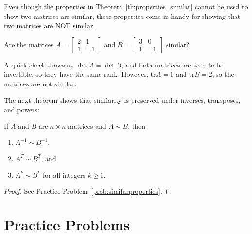 \documentclass{ximera}
\begin{document}
Even though the properties in Theorem~\ref{th:properties_similar} cannot be used to show two matrices are similar, these properties come in handy for showing that two matrices are NOT similar.
 
\begin{example}\label{ex:areTheySimilar}
Are the matrices $A =
\begin{bmatrix}
2 & 1 \\
1 & -1
\end{bmatrix}$ and $B =
\begin{bmatrix}
3 & 0 \\
1 & -1
\end{bmatrix}$ similar?
\begin{explanation}
A quick check shows us $\det A = \det B$, and both matrices are seen to be invertible, so they have the same rank.  However, $\mbox{tr} A = 1$ and $\mbox{tr} B = 2$, so the matrices are not similar.
\end{explanation}
\end{example}
 
The next theorem shows that similarity is preserved under inverses, transposes, and powers:
 
\begin{theorem}\label{th:other_properties_similar}
If $A$ and $B$ are $n\times n$ matrices and $A\sim B$, then
\begin{enumerate}
\item\label{th:properties_similar_inverse} $A^{-1} \sim B^{-1}$,
\item\label{th:properties_similar_transpose} $A^T \sim B^T$, and
\item\label{th:properties_similar_powers} $A^k \sim B^k$ for all integers $k \geq 1$.
\end{enumerate}
\end{theorem}
 
\begin{proof}
See Practice Problem~\ref{prob:similarproperties}.
\end{proof}


 
\section*{Practice Problems}
 
\end{document}
